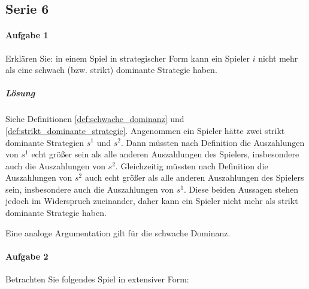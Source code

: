 \subsection{Serie 6}%
\label{sub:serie_6}

\paragraph{Aufgabe 1}%
\label{par:serie_6_aufgabe_1}

Erklären Sie: in einem Spiel in strategischer Form kann ein Spieler $i$ nicht
mehr als eine schwach (bzw. strikt) dominante Strategie haben.

\subparagraph{Lösung}%

Siehe Definitionen \ref{def:schwache_dominanz} und \ref{def:strikt_dominante_strategie}.
Angenommen ein Spieler hätte zwei strikt dominante Strategien $s^1$ und $s^2$.
Dann müssten nach Definition die Auszahlungen von $s^1$ echt größer sein als alle anderen
Auszahlungen des Spielers, insbesondere auch die Auszahlungen von $s^2$.
Gleichzeitig müssten nach Definition die Auszahlungen von $s^2$ auch echt größer als alle
anderen Auszahlungen des Spielers sein, insbesondere auch die Auszahlungen von $s^1$.
Diese beiden Aussagen stehen jedoch im Widerspruch zueinander, daher kann ein Spieler
nicht mehr als strikt dominante Strategie haben.

Eine analoge Argumentation gilt für die schwache Dominanz.

\paragraph{Aufgabe 2}%
\label{par:serie_6_aufgabe_2}

Betrachten Sie folgendes Spiel in extensiver Form:
\begin{center}
\end{center}

